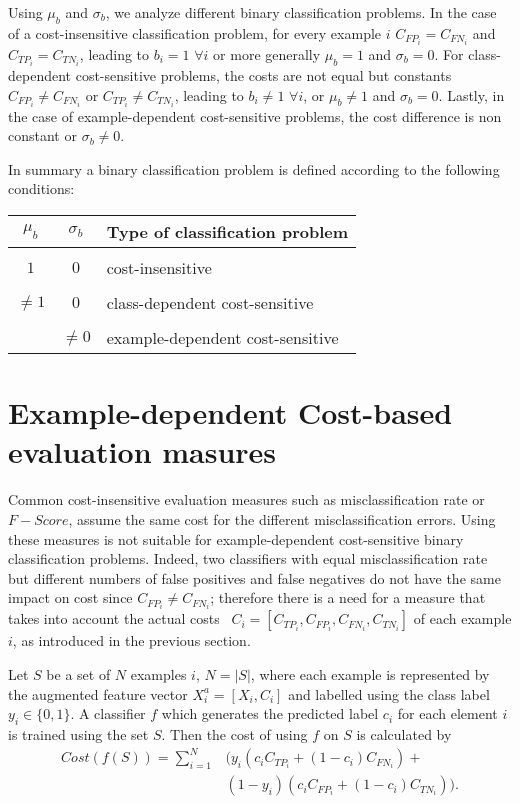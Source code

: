 	  Using $\mu_b$ and $\sigma_b$, we analyze different binary classification problems. In the case 
		of a cost-insensitive classification problem, for every example $i$ \mbox{$C_{FP_i}=C_{FN_i}$}
	  and $C_{TP_i}=C_{TN_i}$, leading to $b_i=1$ $\forall i$ or more generally $\mu_b=1$ and 
		$\sigma_b=0$. For class-dependent cost-sensitive problems, the costs are not equal but 
		constants \mbox{$C_{FP_i}\ne C_{FN_i}$} or \mbox{$C_{TP_i}\ne C_{TN_i}$}, leading to $b_i \ne 
		1$ $\forall i$, or $\mu_b \ne 1$ and $\sigma_b=0$. Lastly, in the case of example-dependent 
		cost-sensitive problems, the cost difference is non constant or $\sigma_b \ne 0$.
  
	  In summary a binary classification problem is defined according to the following conditions:
		\begin{table}[h]
			\centering
      \begin{tabular}{c | c | l}
			  $\mu_b$ & $\sigma_b$ & Type of classification problem \\
			  \hline 
			  && \\
			  $1$ &  $0$ & cost-insensitive \\ &&\\
			  $\ne 1$ & $0$ & class-dependent cost-sensitive \\ &&\\
			  & $\ne 0$ & example-dependent cost-sensitive \\ 
			\end{tabular}
    \end{table}

\section{Example-dependent Cost-based evaluation masures}
	  Common cost-insensitive evaluation measures such as misclassification rate or \mbox{$F-Score$}, 
	  assume the same cost for the different misclassification errors. Using these measures is not 
	  suitable for example-dependent cost-sensitive binary classification problems. Indeed, two 
		classifiers with equal misclassification rate but different numbers of false positives and 
	  false negatives do not have the same impact on cost since \mbox{$C_{FP_i}\ne C_{FN_i}$};
	  therefore there is a need for a measure that takes into account the actual costs 
	  ~$C_i=[C_{TP_i},C_{FP_i},C_{FN_i},C_{TN_i}]$ of each example $i$, as introduced in 
		the previous section.
  
	  Let $S$ be a set of $N$ examples $i$, $N=\vert S \vert$, where each example is represented by 
		the augmented feature vector \mbox{$X^a_i=[X_i, C_i]$} and labelled using the class label $y_i 
		\in \{0,1\}$.
 	  A classifier $f$ which generates the predicted label $c_i$ for each element $i$ is trained 
		using the set $S$. Then the cost of using $f$ on $S$ is calculated by
		\begin{align}\label{eq:cost}
	  	Cost(f(S)) = \sum_{i=1}^{N} & {\bigg( y_i(c_i C_{TP_i} + (1-c_i)C_{FN_i})} + \\
			& {(1-y_i)(c_i C_{FP_i} + (1-c_i)C_{TN_i}) \bigg)}.
		\end{align}

